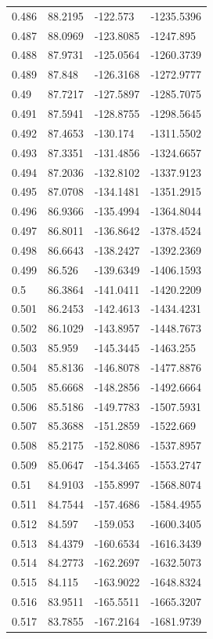 \begin{tabular}{llll}
0.486 & 88.2195 & -122.573 & -1235.5396 \\
0.487 & 88.0969 & -123.8085 & -1247.895 \\
0.488 & 87.9731 & -125.0564 & -1260.3739 \\
0.489 & 87.848 & -126.3168 & -1272.9777 \\
0.49 & 87.7217 & -127.5897 & -1285.7075 \\
0.491 & 87.5941 & -128.8755 & -1298.5645 \\
0.492 & 87.4653 & -130.174 & -1311.5502 \\
0.493 & 87.3351 & -131.4856 & -1324.6657 \\
0.494 & 87.2036 & -132.8102 & -1337.9123 \\
0.495 & 87.0708 & -134.1481 & -1351.2915 \\
0.496 & 86.9366 & -135.4994 & -1364.8044 \\
0.497 & 86.8011 & -136.8642 & -1378.4524 \\
0.498 & 86.6643 & -138.2427 & -1392.2369 \\
0.499 & 86.526 & -139.6349 & -1406.1593 \\
0.5 & 86.3864 & -141.0411 & -1420.2209 \\
0.501 & 86.2453 & -142.4613 & -1434.4231 \\
0.502 & 86.1029 & -143.8957 & -1448.7673 \\
0.503 & 85.959 & -145.3445 & -1463.255 \\
0.504 & 85.8136 & -146.8078 & -1477.8876 \\
0.505 & 85.6668 & -148.2856 & -1492.6664 \\
0.506 & 85.5186 & -149.7783 & -1507.5931 \\
0.507 & 85.3688 & -151.2859 & -1522.669 \\
0.508 & 85.2175 & -152.8086 & -1537.8957 \\
0.509 & 85.0647 & -154.3465 & -1553.2747 \\
0.51 & 84.9103 & -155.8997 & -1568.8074 \\
0.511 & 84.7544 & -157.4686 & -1584.4955 \\
0.512 & 84.597 & -159.053 & -1600.3405 \\
0.513 & 84.4379 & -160.6534 & -1616.3439 \\
0.514 & 84.2773 & -162.2697 & -1632.5073 \\
0.515 & 84.115 & -163.9022 & -1648.8324 \\
0.516 & 83.9511 & -165.5511 & -1665.3207 \\
0.517 & 83.7855 & -167.2164 & -1681.9739 \\

\end{tabular}
